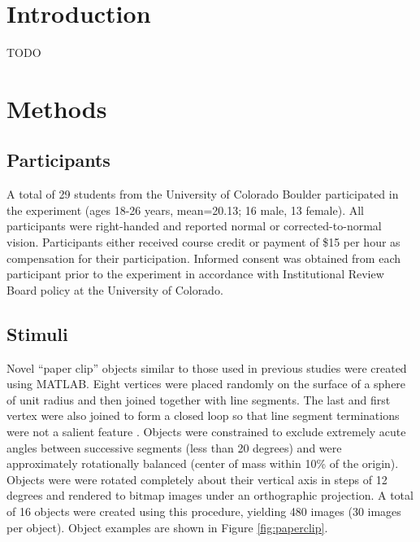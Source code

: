 \documentclass[../dwyatte_dissertation.tex]{subfiles}
\begin{document}
\section{Introduction}
TODO

\section{Methods}

\subsection{Participants}
A total of 29 students from the University of Colorado Boulder participated in the experiment (ages 18-26 years, mean=20.13; 16 male, 13 female). All participants were right-handed and reported normal or corrected-to-normal vision. Participants either received course credit or payment of \$15 per hour as compensation for their participation. Informed consent was obtained from each participant prior to the experiment in accordance with Institutional Review Board policy at the University of Colorado.

\subsection{Stimuli}
Novel ``paper clip'' objects similar to those used in previous studies \cite{BulthoffEdelman92,EdelmanBulthoff92,LogothetisPaulsBulthoffEtAl94,LogothetisPaulsPoggio95,SinhaPoggio96} were created using MATLAB. Eight vertices were placed randomly on the surface of a sphere of unit radius and then joined together with line segments. The last and first vertex were also joined to form a closed loop so that line segment terminations were not a salient feature \cite{BalasSinha09b}. Objects were constrained to exclude extremely acute angles between successive segments (less than 20 degrees) and were approximately rotationally balanced (center of mass within 10\% of the origin). Objects were were rotated completely about their vertical axis in steps of 12 degrees and rendered to bitmap images under an orthographic projection. A total of 16 objects were created using this procedure, yielding 480 images (30 images per object). Object examples are shown in Figure \ref{fig:paperclip}.
\end{document}
